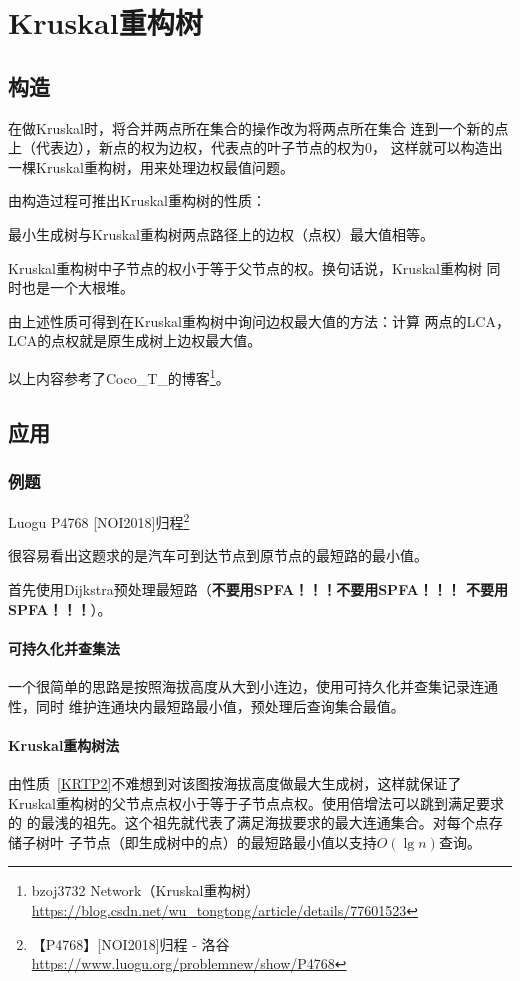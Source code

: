 \section{Kruskal重构树}
\subsection{构造}
在做Kruskal时，将合并两点所在集合的操作改为将两点所在集合
连到一个新的点上（代表边），新点的权为边权，代表点的叶子节点的权为0，
这样就可以构造出一棵Kruskal重构树，用来处理边权最值问题。

由构造过程可推出Kruskal重构树的性质：

\begin{property}
	最小生成树与Kruskal重构树两点路径上的边权（点权）最大值相等。
\end{property}
\begin{property}\label{KRTP2}
	Kruskal重构树中子节点的权小于等于父节点的权。换句话说，Kruskal重构树
	同时也是一个大根堆。
\end{property}
由上述性质可得到在Kruskal重构树中询问边权最大值的方法：计算
两点的LCA，LCA的点权就是原生成树上边权最大值。

以上内容参考了Coco\_T\_的博客\footnote{
	bzoj3732 Network（Kruskal重构树）\\
	\url{https://blog.csdn.net/wu_tongtong/article/details/77601523}
}。
\subsection{应用}
\subsubsection{例题}
Luogu P4768 [NOI2018]归程\footnote{
【P4768】[NOI2018]归程 - 洛谷
\url{https://www.luogu.org/problemnew/show/P4768}
}

很容易看出这题求的是汽车可到达节点到原节点的最短路的最小值。

首先使用Dijkstra预处理最短路（{\bfseries 不要用SPFA！！！不要用SPFA！！！
不要用SPFA！！！}）。

\paragraph{可持久化并查集法}
一个很简单的思路是按照海拔高度从大到小连边，使用可持久化并查集记录连通性，同时
维护连通块内最短路最小值，预处理后查询集合最值。

\paragraph{Kruskal重构树法}
由性质~\ref{KRTP2}不难想到对该图按海拔高度做最大生成树，这样就保证了
Kruskal重构树的父节点点权小于等于子节点点权。使用倍增法可以跳到满足要求的
的最浅的祖先。这个祖先就代表了满足海拔要求的最大连通集合。对每个点存储子树叶
子节点（即生成树中的点）的最短路最小值以支持$O(\lg n)$查询。
